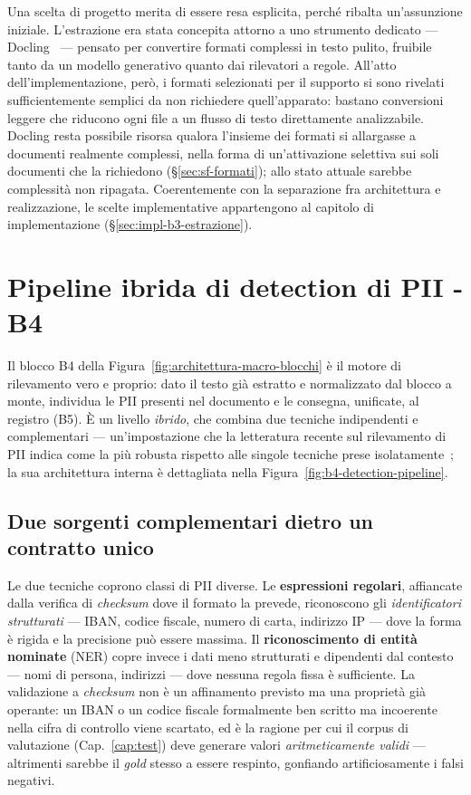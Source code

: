 Una scelta di progetto merita di essere resa esplicita, perché ribalta un'assunzione iniziale. L'estrazione era stata concepita attorno a uno strumento dedicato --- Docling~\cite{livathinosDoclingEfficientOpenSource2025} --- pensato per convertire formati complessi in testo pulito, fruibile tanto da un modello generativo quanto dai rilevatori a regole. All'atto dell'implementazione, però, i formati selezionati per il supporto si sono rivelati sufficientemente semplici da non richiedere quell'apparato: bastano conversioni leggere che riducono ogni file a un flusso di testo direttamente analizzabile. Docling resta possibile risorsa qualora l'insieme dei formati si allargasse a documenti realmente complessi, nella forma di un'attivazione selettiva sui soli documenti che la richiedono (§\ref{sec:sf-formati}); allo stato attuale sarebbe complessità non ripagata. Coerentemente con la separazione fra architettura e realizzazione, le scelte implementative appartengono al capitolo di implementazione (§\ref{sec:impl-b3-estrazione}).

\section{Pipeline ibrida di detection di PII - B4}
\label{sec:b4-pipeline-detection}
\label{sec:rilevamento-b4}

Il blocco B4 della Figura~\ref{fig:architettura-macro-blocchi} è il motore di rilevamento vero e proprio: dato il testo già estratto e normalizzato dal blocco a monte, individua le PII presenti nel documento e le consegna, unificate, al registro (B5). È un livello \emph{ibrido}, che combina due tecniche indipendenti e complementari --- un'impostazione che la letteratura recente sul rilevamento di PII indica come la più robusta rispetto alle singole tecniche prese isolatamente~\cite{mishraHybridRulebasedNLP2025, rajgarhiaEvaluationStudyHybrid2025}; la sua architettura interna è dettagliata nella Figura~\ref{fig:b4-detection-pipeline}.

\subsection{Due sorgenti complementari dietro un contratto unico}
\label{sub:b4-sorgenti}

Le due tecniche coprono classi di PII diverse. Le \textbf{espressioni regolari}, affiancate dalla verifica di \emph{checksum} dove il formato la prevede, riconoscono gli \emph{identificatori strutturati} --- IBAN, codice fiscale, numero di carta, indirizzo IP --- dove la forma è rigida e la precisione può essere massima. Il \textbf{riconoscimento di entità nominate} (NER) copre invece i dati meno strutturati e dipendenti dal contesto --- nomi di persona, indirizzi --- dove nessuna regola fissa è sufficiente. La validazione a \emph{checksum} non è un affinamento previsto ma una proprietà già operante: un IBAN o un codice fiscale formalmente ben scritto ma incoerente nella cifra di controllo viene scartato, ed è la ragione per cui il corpus di valutazione (Cap.~\ref{cap:test}) deve generare valori \emph{aritmeticamente validi} --- altrimenti sarebbe il \emph{gold} stesso a essere respinto, gonfiando artificiosamente i falsi negativi.

